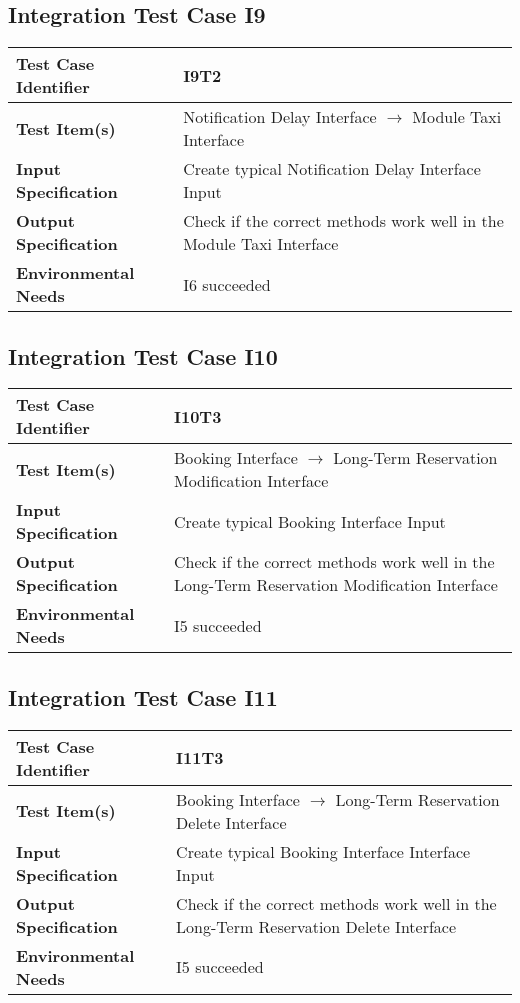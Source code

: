 \subsection{Integration Test Case I9}
\begin{tabular}{l p{9cm}}
	\hline
	\textbf{Test	Case Identifier} & I9T2 \\ \hline
	\textbf{Test	Item(s)} & Notification Delay Interface $\rightarrow$ Module Taxi Interface \\ \hline
	\textbf{Input Specification} & Create typical Notification Delay Interface Input\\ \hline
	\textbf{Output Specification} & Check if the correct methods work well in the Module Taxi Interface \\ \hline
	\textbf{Environmental Needs} & I6 succeeded \\ \hline
\end{tabular}
\vspace{0.5cm}
\subsection{Integration Test Case I10}
\begin{tabular}{l p{9cm}}
	\hline
	\textbf{Test	Case Identifier} & I10T3 \\ \hline
	\textbf{Test	Item(s)} & Booking Interface $\rightarrow$ Long-Term Reservation Modification Interface \\ \hline
	\textbf{Input Specification} & Create typical Booking Interface Input\\ \hline
	\textbf{Output Specification} & Check if the correct methods work well in the Long-Term Reservation Modification Interface \\ \hline
	\textbf{Environmental Needs} & I5 succeeded \\ \hline
\end{tabular}
\vspace{0.5cm}
\subsection{Integration Test Case I11}
\begin{tabular}{l p{9cm}}
	\hline
	\textbf{Test	Case Identifier} & I11T3 \\ \hline
	\textbf{Test	Item(s)} & Booking Interface $\rightarrow$ Long-Term Reservation Delete Interface \\ \hline
	\textbf{Input Specification} & Create typical Booking Interface Interface Input\\ \hline
	\textbf{Output Specification} & Check if the correct methods work well in the Long-Term Reservation Delete Interface \\ \hline
	\textbf{Environmental Needs} & I5 succeeded \\ \hline
\end{tabular}
\vspace{0.5cm}

